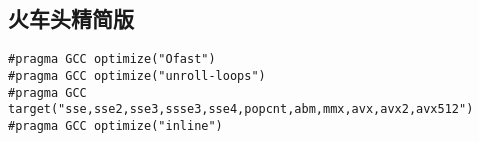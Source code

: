 \documentclass[a4paper,landscape,twocolumn]{ctexart}
\begin{document}

%

\subsection{火车头精简版}

\begin{lstlisting}[]
#pragma GCC optimize("Ofast")
#pragma GCC optimize("unroll-loops")
#pragma GCC target("sse,sse2,sse3,ssse3,sse4,popcnt,abm,mmx,avx,avx2,avx512")
#pragma GCC optimize("inline")
\end{lstlisting}
\end{document}
